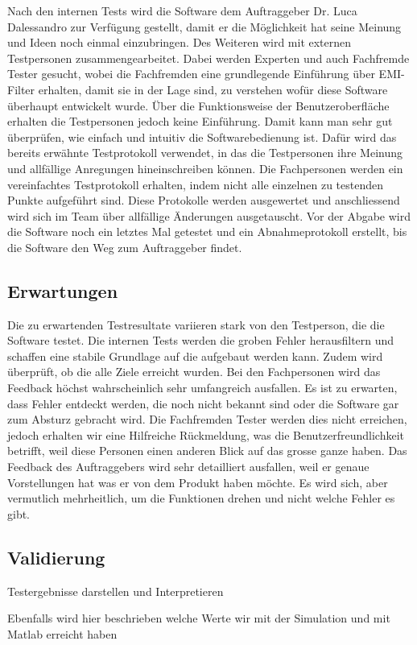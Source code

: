 Nach den internen Tests wird die Software dem Auftraggeber Dr. Luca Dalessandro zur Verfügung gestellt, damit er die Möglichkeit hat seine Meinung und Ideen noch einmal einzubringen. 
Des Weiteren wird mit externen Testpersonen zusammengearbeitet. 
Dabei werden Experten und auch Fachfremde Tester gesucht, wobei die Fachfremden eine grundlegende Einführung über EMI-Filter erhalten, damit sie in der Lage sind, zu verstehen wofür diese Software überhaupt entwickelt wurde. 
Über die Funktionsweise der Benutzeroberfläche erhalten die Testpersonen jedoch keine Einführung. Damit kann man sehr gut überprüfen, wie einfach und intuitiv die Softwarebedienung ist. Dafür wird das bereits erwähnte Testprotokoll verwendet, in das die Testpersonen ihre Meinung und allfällige Anregungen hineinschreiben können. Die Fachpersonen werden ein vereinfachtes Testprotokoll erhalten, indem nicht alle einzelnen zu testenden Punkte aufgeführt sind.   
Diese Protokolle werden ausgewertet und anschliessend wird sich im Team über allfällige Änderungen ausgetauscht. 
Vor der Abgabe wird die Software noch ein letztes Mal getestet und ein Abnahmeprotokoll erstellt, bis die Software den Weg zum Auftraggeber findet.

 









\newpage
\subsection{Erwartungen} \label{subsec:validierung}
Die zu erwartenden Testresultate variieren stark von den Testperson, die die Software testet.
Die internen Tests werden die groben Fehler herausfiltern und schaffen eine stabile Grundlage auf die aufgebaut werden kann. Zudem wird überprüft, ob die alle Ziele erreicht wurden.
Bei den Fachpersonen wird das Feedback höchst wahrscheinlich sehr umfangreich   ausfallen. Es ist zu erwarten, dass Fehler entdeckt werden, die noch nicht bekannt sind oder die Software gar zum Absturz gebracht wird. 
Die Fachfremden Tester werden dies nicht erreichen, jedoch erhalten wir eine Hilfreiche Rückmeldung, was die Benutzerfreundlichkeit betrifft, weil diese Personen einen anderen Blick auf das grosse ganze haben. 
Das Feedback des Auftraggebers wird sehr detailliert ausfallen, weil er genaue Vorstellungen hat was er von dem Produkt haben möchte. Es wird sich, aber vermutlich mehrheitlich, um die Funktionen drehen und nicht welche Fehler es gibt. 



\subsection{Validierung} \label{subsec:validierung}
Testergebnisse darstellen und Interpretieren

Ebenfalls wird hier beschrieben welche Werte wir mit der Simulation und mit Matlab erreicht haben
